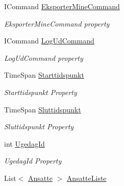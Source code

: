 \begin{DoxyCompactItemize}
I\+Command \hyperlink{class__1aarsproeve_1_1_view_model_1_1_vagtplan_view_model_a4606860561c41d7330663950515cf369}{Eksporter\+Mine\+Command}
\begin{DoxyCompactList}\small\item\em Eksporter\+Mine\+Command property \end{DoxyCompactList}\item 
I\+Command \hyperlink{class__1aarsproeve_1_1_view_model_1_1_vagtplan_view_model_aadc2e0233944328d65644e49b449f89b}{Log\+Ud\+Command}
\begin{DoxyCompactList}\small\item\em Log\+Ud\+Command property \end{DoxyCompactList}\item 
Time\+Span \hyperlink{class__1aarsproeve_1_1_view_model_1_1_vagtplan_view_model_ae31fb2b4cede10a3f44a5e417d83dee0}{Starttidspunkt}
\begin{DoxyCompactList}\small\item\em Starttidspunkt Property \end{DoxyCompactList}\item 
Time\+Span \hyperlink{class__1aarsproeve_1_1_view_model_1_1_vagtplan_view_model_a049f0c84ca19cb72078132b243bf9023}{Sluttidspunkt}
\begin{DoxyCompactList}\small\item\em Sluttidspunkt Property \end{DoxyCompactList}\item 
int \hyperlink{class__1aarsproeve_1_1_view_model_1_1_vagtplan_view_model_a94321a32a1dd0246061c640e105540a7}{Ugedag\+Id}
\begin{DoxyCompactList}\small\item\em Ugedag\+Id Property \end{DoxyCompactList}\item 
List$<$ \hyperlink{class__1aarsproeve_1_1_model_1_1_ansatte}{Ansatte} $>$ \hyperlink{class__1aarsproeve_1_1_view_model_1_1_vagtplan_view_model_a0b9bae0b2b02b911646cfa98f2d5a6e8}{Ansatte\+Liste}

\end{DoxyCompactItemize}
